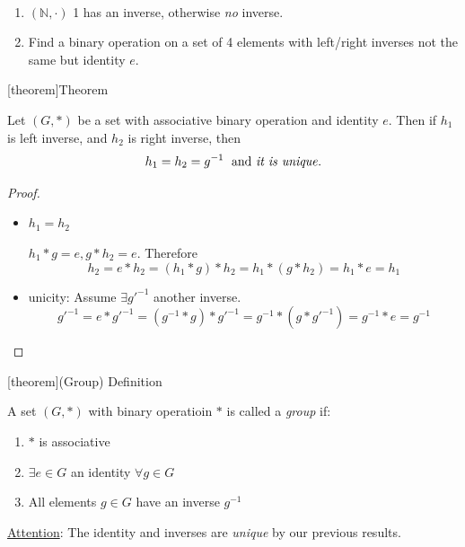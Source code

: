 \documentclass[12pt]{report}
\theoremstyle{definition}
\begin{document}
\begin{ex}
    \,

    \begin{enumerate}[label = (\arabic*)]
        \item $(\mathbb{N}, \cdot)$
            1 has an inverse, otherwise \emph{no} inverse.
        \item Find a binary operation on a set of 4 elements with left/right inverses
            not the same but identity $e$.
    \end{enumerate}
    
\end{ex}

[theorem]{Theorem}
\begin{equal left right inverse}
    Let $(G, *)$ be a set with associative binary operation and identity $e$.
    Then if $h_1$ is left inverse, and $h_2$ is right inverse, then\[
        h_1 = h_2 = g^{-1} \;\text{ and \emph{it is unique}}.
    \]
\end{equal left right inverse}

\begin{proof}
    \;

    \begin{itemize}
            \item $h_1 = h_2$

                $h_1 * g = e, g * h_2 = e$. Therefore\[
                    h_2 = e * h_2 = (h_1 * g) * h_2 = h_1 * (g * h_2) = h_1 * e = h_1
                \]
            \item unicity: Assume $\exists g'^{-1}$ another inverse.\[
                    g'^{-1} = e * g'^{-1} = (g^{-1} * g) * g'^{-1} 
                    = g^{-1} * (g * g'^{-1}) = g^{-1} * e = g^{-1}
            \]
    \end{itemize}
\end{proof}

[theorem]{(Group) Definition}
\begin{Group Definition}
    A set $(G,*)$ with binary operatioin $*$ is called a \emph{group} if:
    \begin{enumerate}[label = (\arabic*)]
        \item $*$ is associative
        \item $\exists e \in G$ an identity $\forall g \in G$
        \item All elements $g \in G$ have an inverse $g^{-1}$
    \end{enumerate}
    \underline{Attention}: The identity and inverses are \emph{unique} by our previous results.
    
\end{Group Definition}
\end{document}
